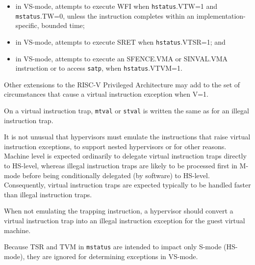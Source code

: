 \begin{itemize}
\item
in VS-mode, attempts to execute WFI when {\tt hstatus}.VTW=1 and
{\tt mstatus}.TW=0, unless the instruction completes within an
implementation-specific, bounded time;

\item
in VS-mode, attempts to execute SRET when {\tt hstatus}.VTSR=1; and

\item
in VS-mode, attempts to execute an SFENCE.VMA or SINVAL.VMA instruction or to
access {\tt satp}, when {\tt hstatus}.VTVM=1.

\end{itemize}
Other extensions to the \mbox{RISC-V} Privileged Architecture may add
to the set of circumstances that cause a virtual instruction exception
when V=1.

On a virtual instruction trap, {\tt mtval} or {\tt stval} is written the
same as for an illegal instruction trap.

\begin{commentary}
It is not unusual that hypervisors must emulate the
instructions that raise virtual instruction exceptions, to
support nested hypervisors or for other reasons.
Machine level is expected ordinarily to delegate virtual instruction
traps directly to HS-level, whereas illegal instruction traps are likely
to be processed first in M-mode before being conditionally delegated (by
software) to HS-level.
Consequently, virtual instruction traps are expected typically to be
handled faster than illegal instruction traps.

When not emulating the trapping instruction,
a hypervisor should convert a virtual
instruction trap into an illegal instruction exception for the guest
virtual machine.
\end{commentary}

\begin{commentary}
Because TSR and TVM in {\tt mstatus} are intended to impact only S-mode
(HS-mode), they are ignored for determining exceptions in VS-mode.
\end{commentary}

